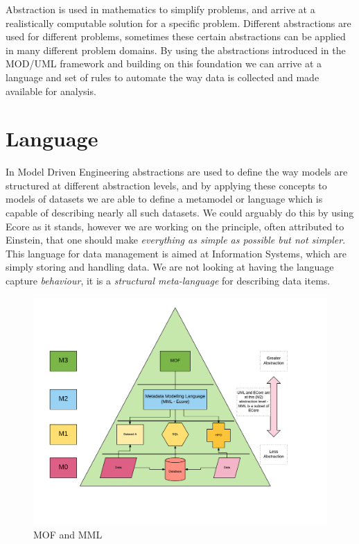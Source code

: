 \documentclass{llncs}
\begin{document}
	Abstraction is used in mathematics to simplify problems, and arrive at a realistically computable solution for a specific problem. Different abstractions are used for different problems, sometimes these certain abstractions can be applied in many different problem domains. By using the abstractions introduced in the MOD/UML framework and building on this foundation we can arrive at a language and set of rules to automate the way data is collected and made available for analysis.
	
	
	
	\section{Language}
	
	In Model Driven Engineering abstractions are used to define the way models are structured at different abstraction levels, and by applying these concepts to models of datasets we are able to define a metamodel or language which is capable of describing nearly all such datasets. We could arguably do this by using Ecore as it stands, however we are working on the principle, often attributed to Einstein, that one should make \emph{everything as simple as possible but not simpler}. This language for data management is aimed at Information Systems, which are simply storing and handling data. We are not looking at having the language capture \emph{behaviour}, it is a \emph{structural meta-language} for describing data items.
	
	\begin{figure}
		\centering
		\includegraphics[scale=0.37]{figures/MMLMOFModel}
		\caption{MOF and MML}
		\label{fig:mofmml}
	\end{figure}
\end{document}

